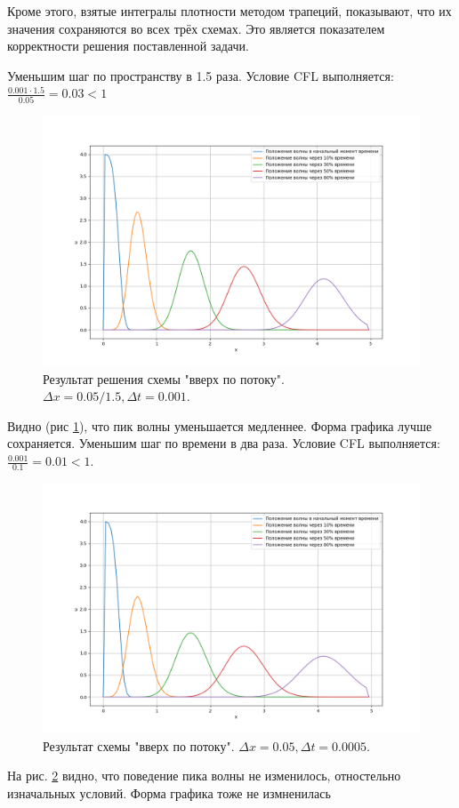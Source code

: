 Кроме этого, взятые интегралы плотности методом трапеций, показывают, что их значения сохраняются во всех трёх схемах. Это является показателем корректности решения поставленной задачи.

\newpage
Уменьшим шаг по пространству в 1.5 раза.  Условие CFL выполняется: $\frac{0.001 \cdot 1.5}{0.05} = 0.03 < 1$

\begin{figure}[h]  %
	\centering
	\includegraphics[height=0.7\textwidth]{imgs/upwind_1.5x.png}  %
	\caption{Результат решения  схемы "вверх по потоку". $\Delta x = 0.05 / 1.5, \Delta t = 0.001$.}  %
	\label{fig:upwind_1.5x}  %
\end{figure}
Видно (рис \ref{fig:upwind_1.5x}), что пик волны уменьшается медленнее. Форма графика лучше сохраняется.
\newpage
Уменьшим шаг по времени в два раза.  Условие CFL выполняется: $\frac{0.001}{0.1} = 0.01 < 1$.
\begin{figure}[h]  %
	\centering
	\includegraphics[height=0.7\textwidth]{imgs/upwind_2t.png}  %
	\caption{Результат схемы "вверх по потоку". $\Delta x = 0.05 , \Delta t = 0.0005$.}  %
	\label{fig:upwind_2t}  %
\end{figure}

На рис. \ref{fig:upwind_2t} видно, что поведение пика волны не изменилось, отностельно изначальных условий. Форма графика тоже не измненилась








